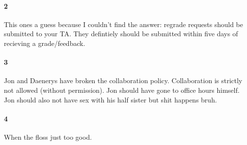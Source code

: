 \documentclass[11pt]{article}
\begin{document}
\paragraph{2}
This ones a guess because I couldn't find the answer: regrade requests should be submitted to your TA. They defintiely should be submitted within five days of recieving a grade/feedback.
\paragraph{3}
Jon and Daenerys have broken the collaboration policy. Collaboration is strictly not allowed (without permission). Jon should have gone to office hours himself. Jon should also not have sex with his half sister but shit happens bruh.
\paragraph{4}
When the floss just too good.


\label{mylastpagelabel}
\end{document}
